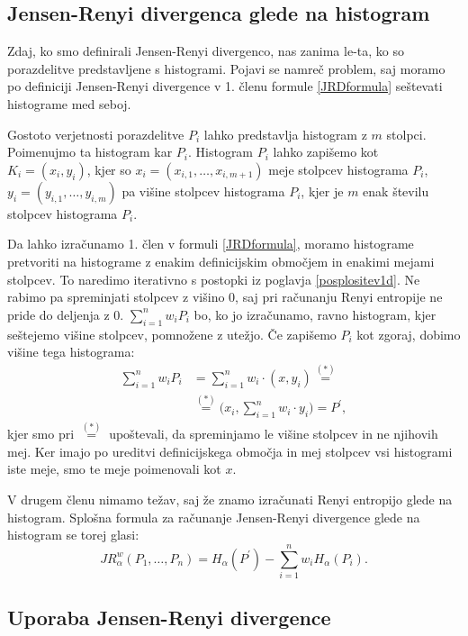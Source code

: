 \subsection{Jensen-Renyi divergenca glede na histogram}

Zdaj, ko smo definirali Jensen-Renyi divergenco, nas zanima le-ta, ko so porazdelitve predstavljene s histogrami. Pojavi se namreč problem, saj moramo po definiciji Jensen-Renyi divergence v 1. členu formule \eqref{JRDformula} seštevati histograme med seboj.

Gostoto verjetnosti porazdelitve $P_i$ lahko predstavlja histogram z $m$ stolpci. Poimenujmo ta histogram kar $P_i$. Histogram $P_i$ lahko zapišemo kot $K_i = (x_i, y_i)$, kjer so $x_i = (x_{i,1}, \ldots, x_{i, m+1})$ meje stolpcev histograma $P_i$, $y_i = (y_{i,1}, \ldots, y_{i,m})$ pa višine stolpcev histograma $P_i$, kjer je $m$ enak številu stolpcev histograma $P_i$.

Da lahko izračunamo 1. člen v formuli \eqref{JRDformula}, moramo histograme pretvoriti na histograme z enakim definicijskim območjem in enakimi mejami stolpcev. To naredimo iterativno s postopki iz poglavja \ref{posplositev1d}. Ne rabimo pa spreminjati stolpcev z višino 0, saj pri računanju Renyi entropije ne pride do deljenja z 0. $\sum_{i=1}^n w_i P_i$ bo, ko jo izračunamo, ravno histogram, kjer seštejemo višine stolpcev, pomnožene z utežjo. Če zapišemo $P_i$ kot zgoraj, dobimo višine tega histograma:
\begin{align}
	\sum_{i=1}^n w_i P_i &= \sum_{i=1}^n w_i \cdot (x, y_i) \overset{(\ast)}{=} \\
	&\overset{(\ast)}{=} \Big(x_i, \sum_{i=1}^n w_i \cdot y_i\Big) = P^\prime,
\end{align}
kjer smo pri $\overset{(\ast)}{=}$ upoštevali, da spreminjamo le višine stolpcev in ne njihovih mej. Ker imajo po ureditvi definicijskega območja in mej stolpcev vsi histogrami iste meje, smo te meje poimenovali kot $x$.

V drugem členu nimamo težav, saj že znamo izračunati Renyi entropijo glede na histogram. Splošna formula za računanje Jensen-Renyi divergence glede na histogram se torej glasi:
\begin{equation}
    JR_\alpha^w (P_1, \ldots, P_n) = H_\alpha (P^\prime) - \sum_{i=1}^n w_i H_\alpha(P_i).
\end{equation}

\pagebreak

\subsection{Uporaba Jensen-Renyi divergence}

